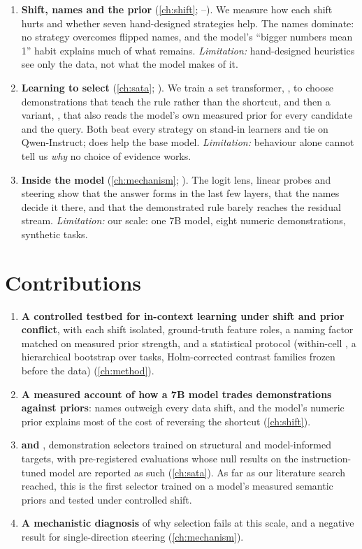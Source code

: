 \begin{enumerate}[leftmargin=2em]
  \item \textbf{Shift, names and the prior} (\autoref{ch:shift}; --).
        We measure how each shift hurts and whether seven hand-designed strategies help.
        The names dominate: no strategy overcomes flipped names, and the model's ``bigger numbers mean 1'' habit explains much of what remains.
        \emph{Limitation:} hand-designed heuristics see only the data, not what the model makes of it.
  \item \textbf{Learning to select} (\autoref{ch:sata}; ).
        We train a set transformer, \sata, to choose demonstrations that teach the rule rather than the shortcut, and then a variant, \satami, that also reads the model's own measured prior for every candidate and the query.
        Both beat every strategy on stand-in learners and tie on Qwen-Instruct; \sata does help the base model.
        \emph{Limitation:} behaviour alone cannot tell us \emph{why} no choice of evidence works.
  \item \textbf{Inside the model} (\autoref{ch:mechanism}; ).
        The logit lens, linear probes and steering show that the answer forms in the last few layers, that the names decide it there, and that the demonstrated rule barely reaches the residual stream.
        \emph{Limitation:} our scale: one 7B model, eight numeric demonstrations, synthetic tasks.
\end{enumerate}

\section{Contributions}

\begin{enumerate}[leftmargin=2em]
  \item \textbf{A controlled testbed for in-context learning under shift and prior conflict}, with each shift isolated, ground-truth feature roles, a naming factor matched on measured prior strength, and a statistical protocol (within-cell \AUROC, a hierarchical bootstrap over tasks, Holm-corrected contrast families frozen before the data) (\autoref{ch:method}).
  \item \textbf{A measured account of how a 7B model trades demonstrations against priors}: names outweigh every data shift, and the model's numeric prior explains most of the cost of reversing the shortcut (\autoref{ch:shift}).
  \item \textbf{\sata and \satami}, demonstration selectors trained on structural and model-informed targets, with pre-registered evaluations whose null results on the instruction-tuned model are reported as such (\autoref{ch:sata}).
        As far as our literature search reached, this is the first selector trained on a model's measured semantic priors and tested under controlled shift.
  \item \textbf{A mechanistic diagnosis} of why selection fails at this scale, and a negative result for single-direction steering (\autoref{ch:mechanism}).
\end{enumerate}

